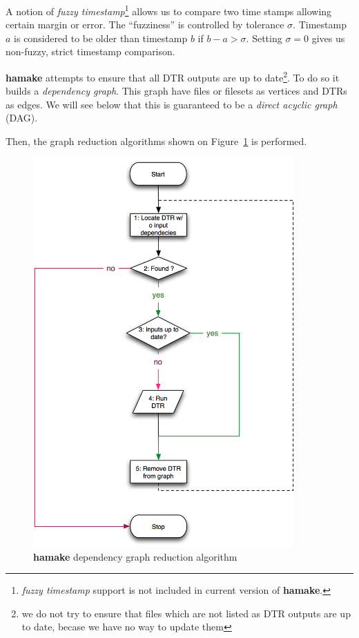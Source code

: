 \documentclass{article}
\begin{document}
A notion of \textit{fuzzy timestamp}\footnote{\textit{fuzzy timestamp}
  support is not included in current version of \textbf{hamake}.}
allows us to compare two time stamps allowing certain margin or
error. The ``fuzziness'' is controlled by tolerance
$\sigma$. Timestamp $a$ is considered to be older than timestamp $b$
if $b-a>\sigma$. Setting $\sigma=0$ gives us non-fuzzy, strict
timestamp comparison.

\textbf{hamake} attempts to ensure that all DTR outputs are up to
date\footnote{we do not try to ensure that files which are not listed
  as DTR outputs are up to date, becase we have no way to update
  them}. To do so it builds a \textit{dependency graph}. This graph
have files or filesets as vertices and DTRs as edges. We will see
below that this is guaranteed to be a \textit{direct acyclic graph}
(DAG).

Then, the graph reduction algorithms shown on Figure~\ref{fig:grred}
is performed.

\begin{figure}[htp]
\centering
\includegraphics[width=10cm]{GraphReduction.png}
\caption{\textbf{hamake} dependency graph reduction algorithm}
\label{fig:grred}
\end{figure}
\end{document}
